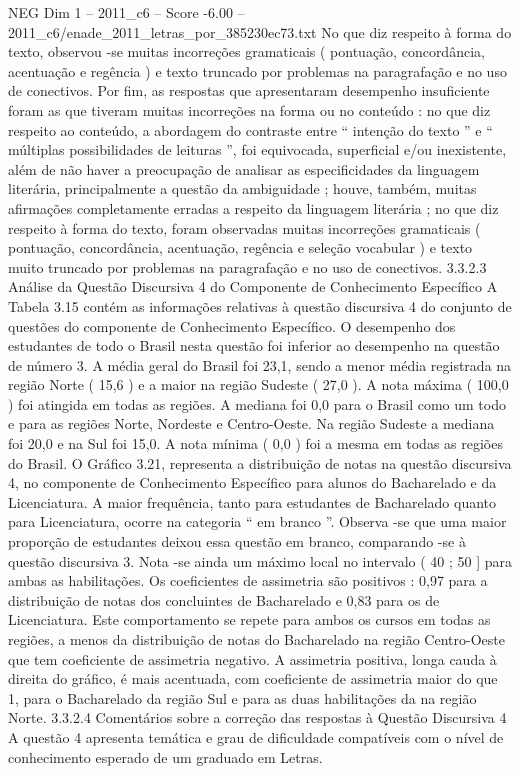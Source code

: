 \begin{textsample}{NEG Dim 1 – 2011\_c6 – Score -6.00 – 2011\_c6/enade\_2011\_letras\_por\_385230ec73.txt}
No que diz respeito à forma do texto, observou -se muitas incorreções gramaticais ( pontuação, concordância, acentuação e regência ) e texto truncado por problemas na paragrafação e no uso de conectivos.
Por fim, as respostas que apresentaram desempenho insuficiente foram as que tiveram muitas incorreções na forma ou no conteúdo : no que diz respeito ao conteúdo, a abordagem do contraste entre “ intenção do texto ” e “ múltiplas possibilidades de leituras ”, foi equivocada, superficial e/ou inexistente, além de não haver a preocupação de analisar as especificidades da linguagem literária, principalmente a questão da ambiguidade ; houve, também, muitas afirmações completamente erradas a respeito da linguagem literária ; no que diz respeito à forma do texto, foram observadas muitas incorreções gramaticais ( pontuação, concordância, acentuação, regência e seleção vocabular ) e texto muito truncado por problemas na paragrafação e no uso de conectivos. 3.3.2.3 Análise da Questão Discursiva 4 do Componente de Conhecimento Específico A Tabela 3.15 contém as informações relativas à questão discursiva 4 do conjunto de questões do componente de Conhecimento Específico.
O desempenho dos estudantes de todo o Brasil nesta questão foi inferior ao desempenho na questão de número 3.
A média geral do Brasil foi 23,1, sendo a menor média registrada na região Norte ( 15,6 ) e a maior na região Sudeste ( 27,0 ).
A nota máxima ( 100,0 ) foi atingida em todas as regiões.
A mediana foi 0,0 para o Brasil como um todo e para as regiões Norte, Nordeste e Centro-Oeste.
Na região Sudeste a mediana foi 20,0 e na Sul foi 15,0.
A nota mínima ( 0,0 ) foi a mesma em todas as regiões do Brasil.
O Gráfico 3.21, representa a distribuição de notas na questão discursiva 4, no componente de Conhecimento Específico para alunos do Bacharelado e da Licenciatura.
A maior frequência, tanto para estudantes de Bacharelado quanto para Licenciatura, ocorre na categoria “ em branco ”.
Observa -se que uma maior proporção de estudantes deixou essa questão em branco, comparando -se à questão discursiva 3.
Nota -se ainda um máximo local no intervalo ( 40 ; 50 ] para ambas as habilitações.
Os coeficientes de assimetria são positivos : 0,97 para a distribuição de notas dos concluintes de Bacharelado e 0,83 para os de Licenciatura.
Este comportamento se repete para ambos os cursos em todas as regiões, a menos da distribuição de notas do Bacharelado na região Centro-Oeste que tem coeficiente de assimetria negativo.
A assimetria positiva, longa cauda à direita do gráfico, é mais acentuada, com coeficiente de assimetria maior do que 1, para o Bacharelado da região Sul e para as duas habilitações da na região Norte. 3.3.2.4 Comentários sobre a correção das respostas à Questão Discursiva 4 A questão 4 apresenta temática e grau de dificuldade compatíveis com o nível de conhecimento esperado de um graduado em Letras.

\end{textsample}
